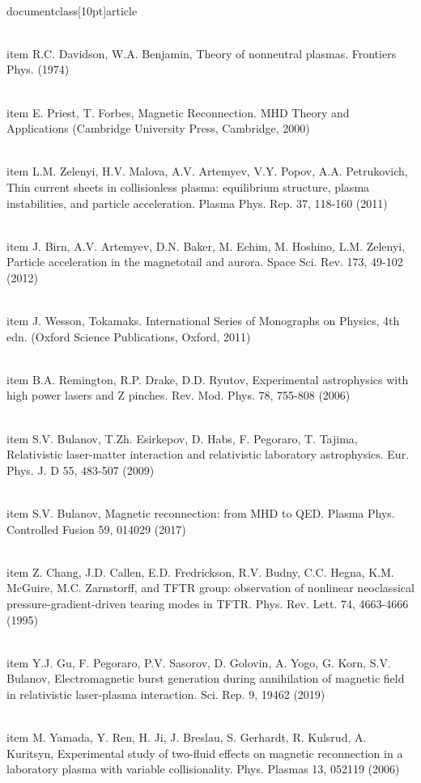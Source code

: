 \\documentclass[10pt]{article}
\begin{document}
{{{{{{  \\item R.C. Davidson, W.A. Benjamin, Theory of nonneutral plasmas. Frontiers Phys. (1974)

  \\item E. Priest, T. Forbes, Magnetic Reconnection. MHD Theory and Applications (Cambridge University Press, Cambridge, 2000)

  \\item L.M. Zelenyi, H.V. Malova, A.V. Artemyev, V.Y. Popov, A.A. Petrukovich, Thin current sheets in collisionless plasma: equilibrium structure, plasma instabilities, and particle acceleration. Plasma Phys. Rep. 37, 118-160 (2011)

  \\item J. Birn, A.V. Artemyev, D.N. Baker, M. Echim, M. Hoshino, L.M. Zelenyi, Particle acceleration in the magnetotail and aurora. Space Sci. Rev. 173, 49-102 (2012)

  \\item J. Wesson, Tokamaks. International Series of Monographs on Physics, 4th edn. (Oxford Science Publications, Oxford, 2011)

  \\item B.A. Remington, R.P. Drake, D.D. Ryutov, Experimental astrophysics with high power lasers and Z pinches. Rev. Mod. Phys. 78, 755-808 (2006)

  \\item S.V. Bulanov, T.Zh. Esirkepov, D. Habs, F. Pegoraro, T. Tajima, Relativistic laser-matter interaction and relativistic laboratory astrophysics. Eur. Phys. J. D 55, 483-507 (2009)

  \\item S.V. Bulanov, Magnetic reconnection: from MHD to QED. Plasma Phys. Controlled Fusion 59, 014029 (2017)

  \\item Z. Chang, J.D. Callen, E.D. Fredrickson, R.V. Budny, C.C. Hegna, K.M. McGuire, M.C. Zarnstorff, and TFTR group: observation of nonlinear neoclassical pressure-gradient-driven tearing modes in TFTR. Phys. Rev. Lett. 74, 4663-4666 (1995)

  \\item Y.J. Gu, F. Pegoraro, P.V. Sasorov, D. Golovin, A. Yogo, G. Korn, S.V. Bulanov, Electromagnetic burst generation during annihilation of magnetic field in relativistic laser-plasma interaction. Sci. Rep. 9, 19462 (2019)

  \\item M. Yamada, Y. Ren, H. Ji, J. Breslau, S. Gerhardt, R. Kulsrud, A. Kuritsyn, Experimental study of two-fluid effects on magnetic reconnection in a laboratory plasma with variable collisionality. Phys. Plasmas 13, 052119 (2006)

}}}}}}
\end{document}
